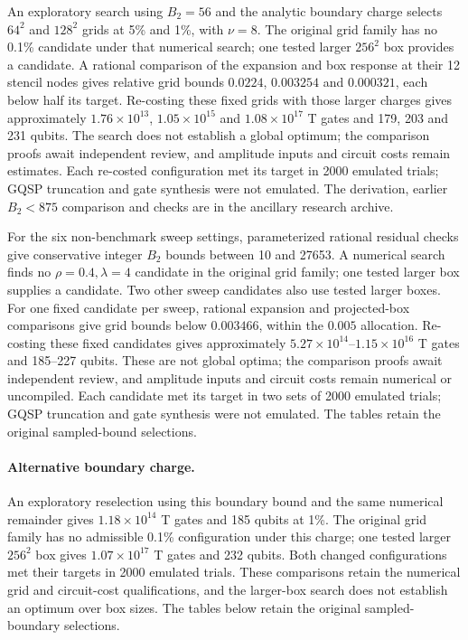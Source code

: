\documentclass[11pt,a4paper]{article}
\theoremstyle{remark}
\begin{document}
An exploratory search using $B_2=56$ and the analytic boundary charge
selects $64^2$ and $128^2$ grids at 5\% and 1\%, with $\nu=8$. The
original grid family has no 0.1\% candidate under that numerical search;
one tested larger $256^2$ box provides a candidate. A rational comparison
of the expansion and box response at their 12 stencil nodes gives relative
grid bounds $0.0224$, $0.003254$ and $0.000321$, each below half its target.
Re-costing these fixed grids with those larger charges gives approximately
$1.76\times10^{13}$, $1.05\times10^{15}$ and $1.08\times10^{17}$ T gates
and 179, 203 and 231 qubits. The search does not establish a global optimum;
the comparison proofs await independent review, and amplitude inputs and
circuit costs remain estimates. Each re-costed configuration met its target
in 2000 emulated trials; GQSP truncation and gate synthesis were not emulated.
The derivation, earlier $B_2<875$ comparison and checks are in the ancillary
research archive.

For the six non-benchmark sweep settings, parameterized rational residual
checks give conservative integer $B_2$ bounds between 10 and 27653. A
numerical search finds no $\rho=0.4,\lambda=4$ candidate in the original
grid family; one tested larger box supplies a candidate. Two other sweep
candidates also use tested larger boxes. For one fixed candidate per sweep,
rational expansion and projected-box comparisons give grid bounds below
$0.003466$, within the $0.005$ allocation. Re-costing these fixed candidates
gives approximately $5.27\times10^{14}$--$1.15\times10^{16}$ T gates and
185--227 qubits. These are not global optima; the comparison proofs await
independent review, and amplitude inputs and circuit costs remain numerical
or uncompiled. Each candidate met its target in two sets of 2000 emulated
trials; GQSP truncation and gate synthesis were not emulated. The tables
retain the original sampled-bound selections.

\paragraph{Alternative boundary charge.}
An exploratory reselection using this boundary bound and the same numerical
remainder gives $1.18\times10^{14}$ T gates and 185 qubits at 1\%. The
original grid family has no admissible 0.1\% configuration under this charge;
one tested larger $256^2$ box gives $1.07\times10^{17}$ T gates and 232
qubits. Both changed configurations met their targets in 2000 emulated trials.
These comparisons retain the numerical grid and circuit-cost qualifications,
and the larger-box search does not establish an optimum over box sizes. The
tables below retain the original sampled-boundary selections.
\end{document}
